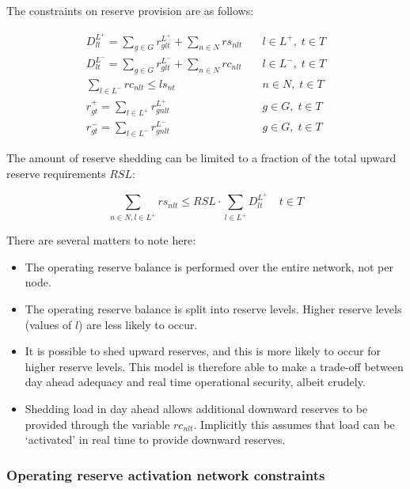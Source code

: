 \documentclass[number,times]{elsarticle}
\begin{document}
The constraints on reserve provision are as follows:

\begin{align}
    D^{L^+}_{lt} = \sum_{g \in G} r^{L^+}_{glt} + \sum_{n \in N} rs_{nlt} & \quad l \in L^+, \; t \in T \\
    D^{L^-}_{lt} = \sum_{g \in G} r^{L^-}_{glt} + \sum_{n \in N} rc_{nlt} & \quad l \in L^-, \; t \in T \\
    \sum_{l \in L^-} rc_{nlt} \leq ls_{nt}                                & \quad n \in N, \; t \in T   \\
    r^{+}_{gt} = \sum_{l \in L^+} r^{L^+}_{gnlt}                          & \quad g \in G, \; t \in T   \\
    r^{-}_{gt} = \sum_{l \in L^-} r^{L^-}_{gnlt}                          & \quad g \in G, \; t \in T
\end{align}

The amount of reserve shedding can be limited to a fraction of the total upward reserve requirements $RSL$:

\begin{equation}
    \sum_{n \in N, l \in L^+} rs_{nlt} \leq RSL \cdot \sum_{l \in L^+} D^{L^+}_{lt} \quad t \in T
\end{equation}

There are several matters to note here:

\begin{itemize}
    \item The operating reserve balance is performed over the entire network, not per node.
    \item The operating reserve balance is split into reserve levels. Higher reserve levels (values of $l$) are less likely to occur.
    \item It is possible to shed upward reserves, and this is more likely to occur for higher reserve levels. This model is therefore able to make a trade-off between day ahead adequacy and real time operational security, albeit crudely.
    \item Shedding load in day ahead allows additional downward reserves to be provided through the variable $rc_{nlt}$. Implicitly this assumes that load can be `activated' in real time to provide downward reserves.
\end{itemize}

\subsubsection{Operating reserve activation network constraints} \label{sec:operating_reserve_network_activation_constraints}
\end{document}
